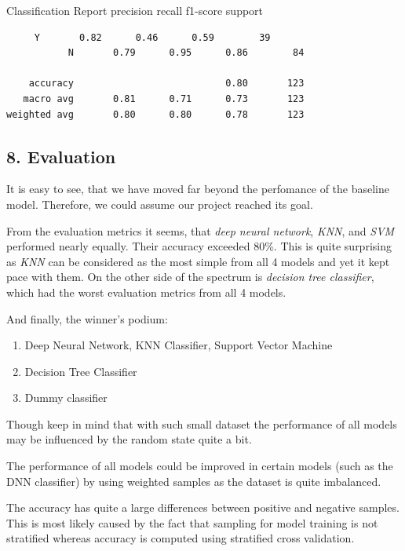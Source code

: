 \documentclass[]{article}
\providecommand{\tightlist}{%
  \setlength{\itemsep}{0pt}\setlength{\parskip}{0pt}}
\begin{document}
Classification Report precision recall f1-score support

\begin{verbatim}
     Y       0.82      0.46      0.59        39
           N       0.79      0.95      0.86        84

    accuracy                           0.80       123
   macro avg       0.81      0.71      0.73       123
weighted avg       0.80      0.80      0.78       123
\end{verbatim}

\hypertarget{evaluation}{%
\subsection{8. Evaluation}\label{evaluation}}

It is easy to see, that we have moved far beyond the perfomance of the
baseline model. Therefore, we could assume our project reached its goal.

From the evaluation metrics it seems, that \emph{deep neural network},
\emph{KNN}, and \emph{SVM} performed nearly equally. Their accuracy
exceeded 80\%. This is quite surprising as \emph{KNN} can be considered
as the most simple from all 4 models and yet it kept pace with them. On
the other side of the spectrum is \emph{decision tree classifier}, which
had the worst evaluation metrics from all 4 models.

And finally, the winner's podium:

\begin{enumerate}
\def\labelenumi{\arabic{enumi}.}
\tightlist
\item
  Deep Neural Network, KNN Classifier, Support Vector Machine
\item
  Decision Tree Classifier
\item
  Dummy classifier
\end{enumerate}

Though keep in mind that with such small dataset the performance of all
models may be influenced by the random state quite a bit.

The performance of all models could be improved in certain models (such
as the DNN classifier) by using weighted samples as the dataset is quite
imbalanced.

The accuracy has quite a large differences between positive and negative
samples. This is most likely caused by the fact that sampling for model
training is not stratified whereas accuracy is computed using stratified
cross validation.
\end{document}
